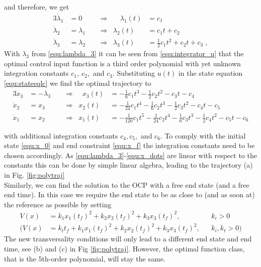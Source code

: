 and therefore, we get
\begin{alignat}{3}
\nonumber
	\dot \lambda_1 &= 0 \quad  & &\Rightarrow &\quad \lambda_1(t) &= c_1 \\
\nonumber
	\dot \lambda_2 &= \lambda_1 & &\Rightarrow  & \lambda_2(t) &= c_1 t + c_2 \\
\label{equ:lambda_3}
	\dot \lambda_3 &= \lambda_2 & &\Rightarrow  & \lambda_3(t) &= \frac{1}{2}c_1 t^2 + c_2 t + c_3 \; , 
\end{alignat}
With $\lambda_3$ from \eqref{equ:lambda_3} it can be seen from \eqref{equ:integrator_u} that the optimal control input function is a third order polynomial with yet unknown integration constants $c_1, \ c_2,$ and $c_3$. Substituting $u(t)$ in the state equation \eqref{equ:stateeqlc} we find the optimal trajectory to 
\begin{alignat}{3}
	\dot x_3 &= -\lambda_3 \;\;  & &\Rightarrow &\;\; x_3(t) &= -\frac{1}{6}c_1 t^3 - \frac{1}{2}c_2 t^2 - c_3 t - c_4 \\
	\dot x_2 &= x_3 & &\Rightarrow  & x_2(t) &= -\frac{1}{24} c_1 t^4 - \frac{1}{6}c_2 t^3 - \frac{1}{2} c_3 t^2 - c_4 t - c_5 \\
	\dot x_1 &= x_2 & &\Rightarrow  & x_1(t) &= -\frac{1}{120} c_1 t^5 - \frac{1}{24} c_2 t^4 - \frac{1}{6}c_3 t^3 -\frac{1}{2}c_4 t^2 - c_5 t - c_6
	\label{equ:x_dots}
\end{alignat}

with additional integration constants $c_4,c_5,$ and $c_6$. To comply with the initial state \eqref{equ:x_0} and end constraint \eqref{equ:x_f} the integration constants need to be chosen accordingly. As \eqref{equ:lambda_3}-\eqref{equ:x_dots} are linear with respect to the constants this can be done by simple linear algebra, leading to the trajectory (a) in Fig. \ref{fig:polytraj} 
\\
Similarly, we can find the solution to the OCP with a free end state (and a free end time). In this case we require the end state to be as close to (and as soon at) the reference as possible by setting
\begin{align*}
V(x) &=k_1 x_1 (t_f)^2+k_2 x_2(t_f)^2 + k_3 x_3(t_f)^2 ,&& k_i>0\\
(V(x) &=k_t t_f+k_1 x_1 (t_f)^2+k_2 x_2(t_f)^2 + k_3 x_3(t_f)^2 ,&& k_i,k_t>0 )
\end{align*}
The new transversality conditions will only lead to a different end state and end time, see (b) and (c) in Fig \ref{fig:polytraj}. However, the optimal function class, that is the 5th-order polynomial, will stay the same.

